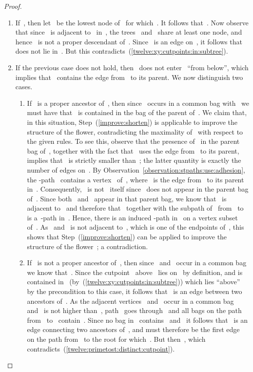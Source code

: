 \begin{proof}
\begin{claimproof}
\begin{enumerate}
	\item If~, then let~ be the lowest node of~ for which~. It follows that~. Now observe that since~ is adjacent to~ in~, the trees~ and~ share at least one node, and hence~ is not a proper descendant of~. Since~ is an edge on~, it follows that~ does not lie in~. But this contradicts~(\ref{twelve:xy:cutpoints:in:subtree}).
	\item If the previous case does not hold, then~ does not enter~ ``from below'', which implies that~ contains the edge from~ to its parent. We now distinguish two cases.
	\begin{enumerate}
		\item If~ is a proper ancestor of~, then since~ occurs in a common bag with~ we must have that~ is contained in the bag of the parent of~. We claim that, in this situation, Step~(\ref{improve:shorten}) is applicable to improve the structure of the flower, contradicting the maximality of~ with respect to the given rules. To see this, observe that the presence of~ in the parent bag of~, together with the fact that~ uses the edge from~ to its parent, implies that~ is strictly smaller than~; the latter quantity is exactly the number of edges on~. By Observation~\ref{observation:stpaths:use:adhesion}, the -path~ contains a vertex~ of~, where~ is the edge from~ to its parent in~. Consequently,~ is not~ itself since~ does not appear in the parent bag of~. Since both~ and~ appear in that parent bag, we know that~ is adjacent to~ and therefore that~ together with the subpath of~ from~ to~ is a~-path in~. Hence, there is an induced -path in~ on a vertex subset of~. As~ and~ is not adjacent to~, which is one of the endpoints of~, this shows that Step~(\ref{improve:shorten}) can be applied to improve the structure of the flower~; a contradiction.
		\item If~ is not a proper ancestor of~, then since~ and~ occur in a common bag we know that~. Since the cutpoint~ above~ lies on~ by definition, and is contained in~ (by~(\ref{twelve:xy:cutpoints:in:subtree})) which lies ``above''~ by the precondition to this case, it follows that~ is an edge between two ancestors of~. As the adjacent vertices~ and~ occur in a common bag and~ is not higher than~, path~ goes through~ and all bags on the path from~ to~ contain~. Since no bag in~ contains~ and~ it follows that~ is an edge connecting two ancestors of~, and must therefore be the first edge~ on the path from~ to the root for which~. But then~, which contradicts~(\ref{twelve:primetost:distinct:cutpoint}).
	\end{enumerate}
\end{enumerate}


\end{claimproof}
\end{proof}
